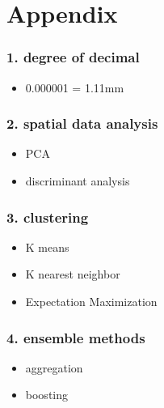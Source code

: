 \documentclass[11pt]{article}
\providecommand{\tightlist}{%
      \setlength{\itemsep}{0pt}\setlength{\parskip}{0pt}}
\begin{document}
    \section{Appendix}\label{appendix}

    \subsubsection{1. degree of decimal}\label{degree-of-decimal}

\begin{itemize}
\tightlist
\item
  0.000001 = 1.11mm
\end{itemize}

\subsubsection{2. spatial data analysis}\label{spatial-data-analysis}

\begin{itemize}
\tightlist
\item
  PCA
\item
  discriminant analysis
\end{itemize}

\subsubsection{3. clustering}\label{clustering}

\begin{itemize}
\tightlist
\item
  K means
\item
  K nearest neighbor
\item
  Expectation Maximization
\end{itemize}

\subsubsection{4. ensemble methods}\label{ensemble-methods}

\begin{itemize}
\tightlist
\item
  aggregation
\item
  boosting
\end{itemize}


    
    
    
    
\end{document}
